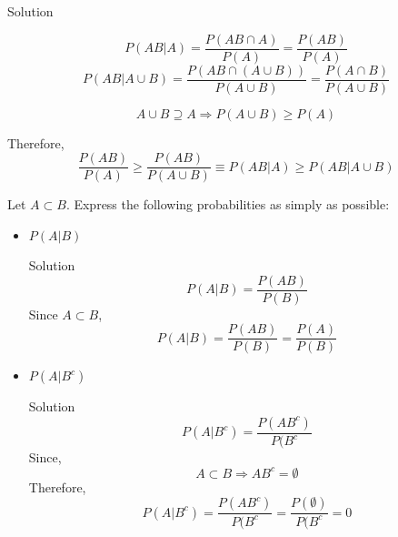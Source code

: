 \documentclass{article}
\begin{document}
\begin{spacing}{1.1}
\begin{homeworkProblem}
  \begin{homeworkSection}{Solution}

    \[P(AB|A) = \frac{ P( AB \cap A)}{ P( A)} = \frac{ P( AB)}{ P( A)}\]
    \[P( AB|A \cup B) = \frac{ P( AB \cap (A \cup B))}{ P( A \cup B)} = \frac{ P( A \cap B)}{ P( A \cup B)}\]

    \[ A \cup B \supseteq A \Rightarrow P( A \cup B) \ge P( A)\]

    Therefore,
      \[\frac{ P( AB)}{ P( A)} \ge \frac{ P( AB)}{ P( A \cup B)} \equiv P(AB|A) \ge P( AB|A \cup B)\]
    
  \end{homeworkSection}
\end{homeworkProblem}
\newpage
\begin{homeworkProblem}
  Let $A \subset B$. Express the following probabilities as simply as possible:
  \begin{itemize}
    \item $P( A|B)$
      \begin{homeworkSection}{Solution}
        \[P( A|B) = \frac{ P( AB)}{ P(B)}\]
        Since $A \subset B$, 
        \[P( A|B) = \frac{ P( AB)}{ P(B)} = \frac{ P( A)}{ P( B)}\]
     \end{homeworkSection}
    \item $P( A|B^c)$
      \begin{homeworkSection}{Solution}
        \[P( A|B^c) = \frac{ P( AB^c)}{ P( B^c}\]
        Since,
          \[A \subset B \Rightarrow AB^c = \emptyset\]
        Therefore,
        \[P( A|B^c) = \frac{ P( AB^c)}{ P( B^c} = \frac{ P( \emptyset)}{ P( B^c} = 0\]
      \end{homeworkSection}
  \end{itemize}
\end{homeworkProblem}

\end{spacing}
\end{document}
